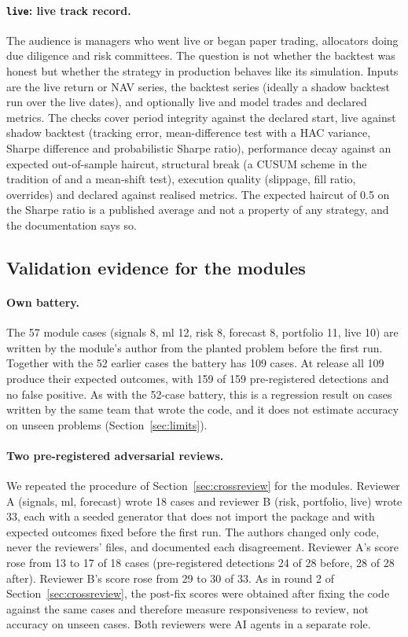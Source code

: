 \documentclass[11pt]{article}
\begin{document}
\paragraph{\texttt{live}: live track record.} The audience is managers who went live or began paper trading, allocators doing due diligence and risk committees. The question is not whether the backtest was honest but whether the strategy in production behaves like its simulation. Inputs are the live return or NAV series, the backtest series (ideally a shadow backtest run over the live dates), and optionally live and model trades and declared metrics. The checks cover period integrity against the declared start, live against shadow backtest (tracking error, mean-difference test with a HAC variance, Sharpe difference and probabilistic Sharpe ratio), performance decay against an expected out-of-sample haircut, structural break (a CUSUM scheme in the tradition of \citealt{Page1954} and a mean-shift test), execution quality (slippage, fill ratio, overrides) and declared against realised metrics. The expected haircut of 0.5 on the Sharpe ratio is a published average and not a property of any strategy, and the documentation says so.

\subsection{Validation evidence for the modules}

\paragraph{Own battery.} The 57 module cases (signals 8, ml 12, risk 8, forecast 8, portfolio 11, live 10) are written by the module's author from the planted problem before the first run. Together with the 52 earlier cases the battery has 109 cases. At release all 109 produce their expected outcomes, with 159 of 159 pre-registered detections and no false positive. As with the 52-case battery, this is a regression result on cases written by the same team that wrote the code, and it does not estimate accuracy on unseen problems (Section~\ref{sec:limits}).

\paragraph{Two pre-registered adversarial reviews.} We repeated the procedure of Section~\ref{sec:crossreview} for the modules. Reviewer A (signals, ml, forecast) wrote 18 cases and reviewer B (risk, portfolio, live) wrote 33, each with a seeded generator that does not import the package and with expected outcomes fixed before the first run. The authors changed only code, never the reviewers' files, and documented each disagreement. Reviewer A's score rose from 13 to 17 of 18 cases (pre-registered detections 24 of 28 before, 28 of 28 after). Reviewer B's score rose from 29 to 30 of 33. As in round 2 of Section~\ref{sec:crossreview}, the post-fix scores were obtained after fixing the code against the same cases and therefore measure responsiveness to review, not accuracy on unseen cases. Both reviewers were AI agents in a separate role.
\end{document}
